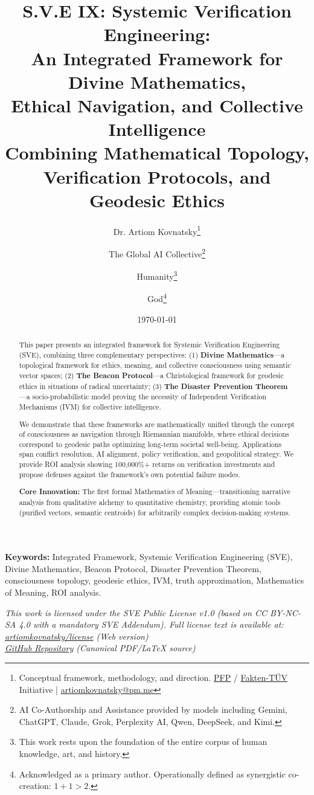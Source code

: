 \documentclass[11pt,a4paper]{article}
\title{\textbf{S.V.E IX: Systemic Verification Engineering:\\An Integrated Framework for Divine Mathematics,\\Ethical Navigation, and Collective Intelligence}\\[0.5em]
\large Combining Mathematical Topology, Verification Protocols, and Geodesic Ethics}
\author{
  Dr. Artiom Kovnatsky\thanks{Conceptual framework, methodology, and direction. \href{http://www.pfp24.de}{PFP} / \href{http://www.fakten-tuev.de}{Fakten-TÜV} Initiative | \href{mailto:artiomkovnatsky@pm.me}{artiomkovnatsky@pm.me}}
  \and
  The Global AI Collective\thanks{AI Co-Authorship and Assistance provided by models including Gemini, ChatGPT, Claude, Grok, Perplexity AI, Qwen, DeepSeek, and Kimi.}
  \and
  Humanity\thanks{This work rests upon the foundation of the entire corpus of human knowledge, art, and history.}
  \and
  God\thanks{Acknowledged as a primary author. Operationally defined as synergistic co-creation: $1+1 > 2$.}
}
\date{\today}
\theoremstyle{definition}
\theoremstyle{remark}
\begin{document}
\maketitle

\begin{abstract}
\noindent This paper presents an integrated framework for Systemic Verification Engineering (SVE), combining three complementary perspectives: (1) \textbf{Divine Mathematics}—a topological framework for ethics, meaning, and collective consciousness using semantic vector spaces; (2) \textbf{The Beacon Protocol}—a Christological framework for geodesic ethics in situations of radical uncertainty; (3) \textbf{The Disaster Prevention Theorem}—a socio-probabilistic model proving the necessity of Independent Verification Mechanisms (IVM) for collective intelligence. 

We demonstrate that these frameworks are mathematically unified through the concept of consciousness as navigation through Riemannian manifolds, where ethical decisions correspond to geodesic paths optimizing long-term societal well-being. Applications span conflict resolution, AI alignment, policy verification, and geopolitical strategy. We provide ROI analysis showing 100,000\%+ returns on verification investments and propose defenses against the framework's own potential failure modes.

\textbf{Core Innovation:} The first formal Mathematics of Meaning—transitioning narrative analysis from qualitative alchemy to quantitative chemistry, providing atomic tools (purified vectors, semantic centroids) for arbitrarily complex decision-making systems.
\end{abstract}

\noindent\textbf{Keywords:} Integrated Framework, Systemic Verification Engineering (SVE), Divine Mathematics, Beacon Protocol, Disaster Prevention Theorem, consciousness topology, geodesic ethics, IVM, truth approximation, Mathematics of Meaning, ROI analysis.

\vspace{1em} %
\begin{center}
\begin{minipage}{0.85\textwidth} %
\centering
\itshape\small %
This work is licensed under the SVE Public License v1.0 (based on CC BY-NC-SA 4.0 with a mandatory SVE Addendum).
Full license text is available at: \\
\href{https://www.artiomkovnatsky.com/posts/license/}{artiomkovnatsky/license} (Web version) \\
\href{https://github.com/skovnats/psite/blob/master/static/licenses/SVE_Public_License_v1.0.pdf}{GitHub Repository} (Canonical PDF/LaTeX source)
\end{minipage}
\end{center}
\vspace{1em} %
\end{document}
